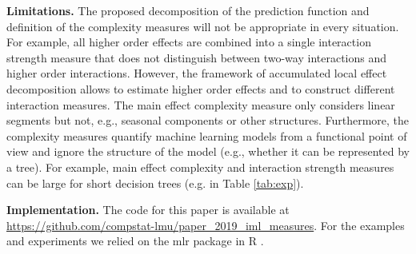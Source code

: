 \documentclass[runningheads]{llncs}\usepackage[]{graphicx}\usepackage[]{color}
\begin{document}
\textbf{Limitations.}
The proposed decomposition of the prediction function and definition of the complexity measures will not be appropriate in every situation.
For example, all higher order effects are combined into a single interaction strength measure that does not distinguish between two-way interactions and higher order interactions.
However, the framework of accumulated local effect decomposition allows to estimate higher order effects and to construct different interaction measures.
The main effect complexity measure only considers linear segments but not, e.g., seasonal components or other structures.
Furthermore, the complexity measures quantify machine learning models from a functional point of view and ignore the structure of the model (e.g., whether it can be represented by a tree).
For example, main effect complexity and interaction strength measures can be large for short decision trees (e.g. in Table \ref{tab:exp}). 

\textbf{Implementation.}
The code for this paper is available at \url{https://github.com/compstat-lmu/paper_2019_iml_measures}.
For the examples and experiments we relied on the mlr package \citep{JMLR:v17:15-066} in R \citep{r2018}.
\end{document}
